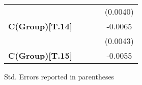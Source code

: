 \begin{center}
\begin{tabular}{lcccc}
\textbf{ }                     &                  &                  &                  &     (0.0040)      \\
\textbf{C(Group)[T.14]}        &                  &                  &                  &     -0.0065       \\
\textbf{ }                     &                  &                  &                  &     (0.0043)      \\
\textbf{C(Group)[T.15]}        &                  &                  &                  &     -0.0055       \\
\bottomrule
\end{tabular}
\end{center}

Std. Errors reported in parentheses